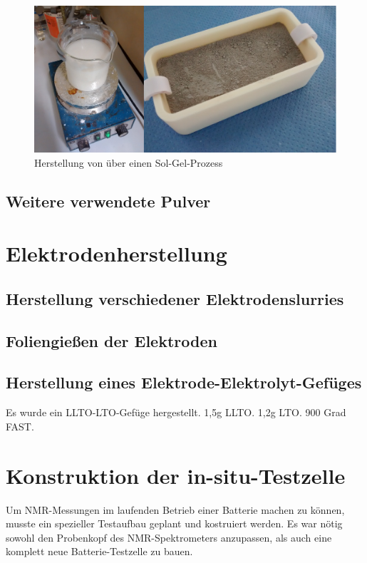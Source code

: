 \documentclass[a4paper, 11pt, headsepline,footsepline,twoside,abstract]{scrbook}
\begin{document}
\subsection{}
\begin{figure}
	\centering
	\includegraphics[width=1.0\columnwidth]{images/SolGel.jpg}
	\caption{Herstellung von  über einen Sol-Gel-Prozess}
	\label{sol_gel}
\end{figure}
\subsection{Weitere verwendete Pulver}
\section{Elektrodenherstellung}
\subsection{Herstellung verschiedener Elektrodenslurries}
\subsection{Foliengießen der Elektroden}
\subsection{Herstellung eines Elektrode-Elektrolyt-Gefüges}
Es wurde ein LLTO-LTO-Gefüge hergestellt. 1,5g LLTO. 1,2g LTO. 900 Grad FAST.
\section{Konstruktion der in-situ-Testzelle}
Um NMR-Messungen im laufenden Betrieb einer Batterie machen zu können, musste ein spezieller Testaufbau geplant und kostruiert werden. Es war nötig sowohl den Probenkopf des NMR-Spektrometers anzupassen, als auch eine komplett neue Batterie-Testzelle zu bauen.
\end{document}

